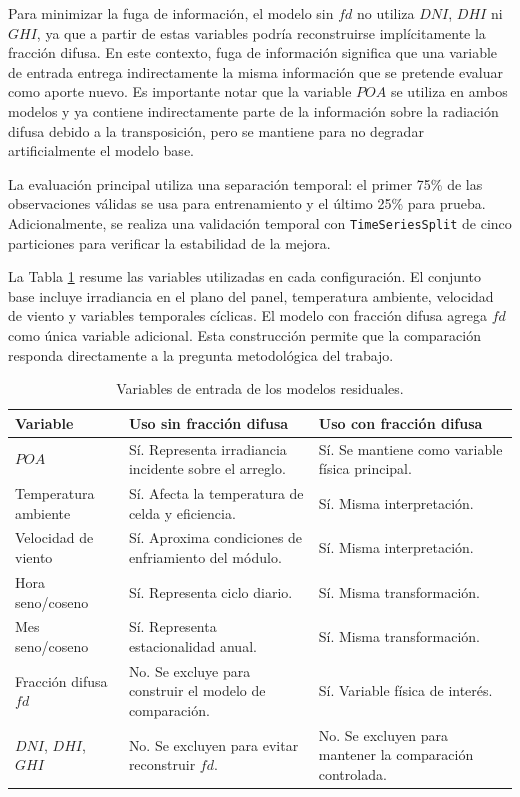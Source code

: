 \documentclass[12pt, letterpaper]{article}
\begin{document}
Para minimizar la fuga de informaci\'on, el modelo sin \(fd\) no utiliza \(DNI\), \(DHI\) ni \(GHI\), ya que a partir de estas variables podr\'ia reconstruirse impl\'icitamente la fracci\'on difusa. En este contexto, fuga de informaci\'on significa que una variable de entrada entrega indirectamente la misma informaci\'on que se pretende evaluar como aporte nuevo. Es importante notar que la variable \(POA\) se utiliza en ambos modelos y ya contiene indirectamente parte de la informaci\'on sobre la radiaci\'on difusa debido a la transposici\'on, pero se mantiene para no degradar artificialmente el modelo base.

La evaluaci\'on principal utiliza una separaci\'on temporal: el primer 75\% de las observaciones v\'alidas se usa para entrenamiento y el \'ultimo 25\% para prueba. Adicionalmente, se realiza una validaci\'on temporal con \texttt{TimeSeriesSplit} de cinco particiones para verificar la estabilidad de la mejora.

La Tabla \ref{tab:variables_xgboost} resume las variables utilizadas en cada configuraci\'on. El conjunto base incluye irradiancia en el plano del panel, temperatura ambiente, velocidad de viento y variables temporales c\'iclicas. El modelo con fracci\'on difusa agrega \(fd\) como \'unica variable adicional. Esta construcci\'on permite que la comparaci\'on responda directamente a la pregunta metodol\'ogica del trabajo.

\begin{table}[H]
\centering
\caption{Variables de entrada de los modelos residuales.}
\label{tab:variables_xgboost}
\small
\begin{tabularx}{\textwidth}{lXX}
\toprule
\textbf{Variable} & \textbf{Uso sin fracci\'on difusa} & \textbf{Uso con fracci\'on difusa} \\
\midrule
\(POA\) & S\'i. Representa irradiancia incidente sobre el arreglo. & S\'i. Se mantiene como variable f\'isica principal. \\
Temperatura ambiente & S\'i. Afecta la temperatura de celda y eficiencia. & S\'i. Misma interpretaci\'on. \\
Velocidad de viento & S\'i. Aproxima condiciones de enfriamiento del m\'odulo. & S\'i. Misma interpretaci\'on. \\
Hora seno/coseno & S\'i. Representa ciclo diario. & S\'i. Misma transformaci\'on. \\
Mes seno/coseno & S\'i. Representa estacionalidad anual. & S\'i. Misma transformaci\'on. \\
Fracci\'on difusa \(fd\) & No. Se excluye para construir el modelo de comparaci\'on. & S\'i. Variable f\'isica de inter\'es. \\
\(DNI\), \(DHI\), \(GHI\) & No. Se excluyen para evitar reconstruir \(fd\). & No. Se excluyen para mantener la comparaci\'on controlada. \\
\bottomrule
\end{tabularx}
\end{table}
\end{document}
